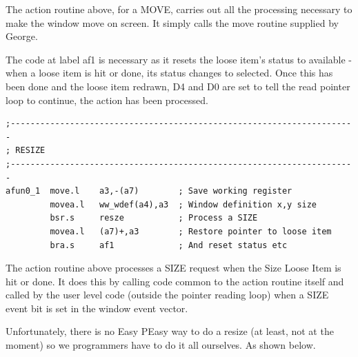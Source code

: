 The action routine above, for a MOVE, carries out all the processing
        necessary to make the window move on screen. It simply calls the move routine
        supplied by George.

The code at label af1 is necessary as it resets the loose item's status to
        available -{} when a loose item is hit or done, its status changes to selected.
        Once this has been done and the loose item redrawn, D4 and D0 are set to tell the
        read pointer loop to continue, the action has been processed.

\begin{lstlisting}[firstnumber=last,caption={Ex0 - SIZE Loose Item Action Routine}]
;----------------------------------------------------------------------
; RESIZE
;----------------------------------------------------------------------                                    
afun0_1  move.l    a3,-(a7)        ; Save working register
         movea.l   ww_wdef(a4),a3  ; Window definition x,y size
         bsr.s     resze           ; Process a SIZE
         movea.l   (a7)+,a3        ; Restore pointer to loose item
         bra.s     af1             ; And reset status etc
\end{lstlisting}

The action routine above processes a SIZE request when the Size Loose Item
        is hit or done. It does this by calling code common to the action routine itself
        and called by the user level code (outside the pointer reading loop) when a SIZE
        event bit is set in the window event vector.

Unfortunately, there is no Easy PEasy way to do a resize (at least, not at
        the moment) so we programmers have to do it all ourselves. As shown below.

